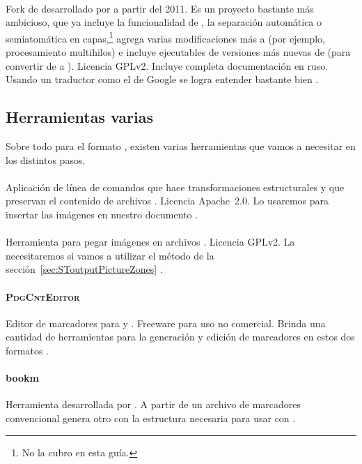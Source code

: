 \documentclass[%
	a5paper,
	10pt,
	twoside,
	openright,
	final,
]{memoir}
\begin{document}
{	\paragraph{\djvusmallmod} Fork de \djvusmall desarrollado por \textsharik a partir del 2011. Es un proyecto bastante más ambicioso, que ya incluye la funcionalidad de \djvuimager, la separación automática o semiatomática en capas,\footnote{No la cubro en esta guía.} agrega varias modificaciones más a  (por ejemplo, procesamiento multihilos) e incluye ejecutables de versiones más nuevas de \dexpress (para convertir de \djvu a \pdf). Licencia GPLv2. Incluye completa documentación en ruso. Usando un traductor como el de Google se logra entender bastante bien \cite{DjVuSmallMod}.

	\subsection{Herramientas varias} Sobre todo para el formato \djvu, existen varias herramientas que vamos a necesitar en los distintos pasos.
	\paragraph{\qpdf} Aplicación de línea de comandos que hace transformaciones estructurales y que preservan el contenido de archivos \pdf. Licencia Apache~2.0. Lo usaremos para insertar las imágenes en nuestro documento \pdf \cite{QPDF}.
	\paragraph{\djvuimager} Herramienta para pegar imágenes en archivos \djvu. Licencia GPLv2. La necesitaremos si vamos a utilizar el método de la sección~\ref{sec:SToutputPictureZones} \cite{DjVuImager}.
	\paragraph{\textsc{PdgCntEditor}} Editor de marcadores para \pdf y \djvu. Freeware para uso no comercial. Brinda una cantidad de herramientas para la generación y edición de marcadores en estos dos formatos \cite{PdgCntEditor}.
	\paragraph{bookm} Herramienta desarrollada por \mondaytwothousand. A partir de un archivo de marcadores convencional genera otro con la estructura necesaria para usar con  \cite{bookm}.

}
\end{document}
